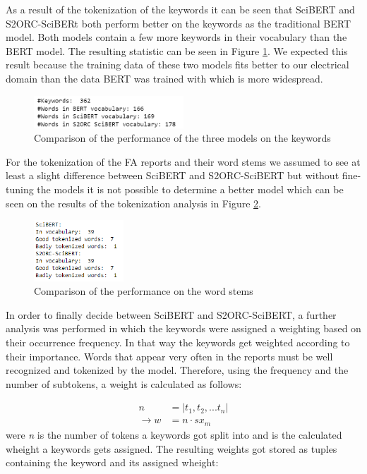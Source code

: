 As a result of the tokenization of the keywords it can be seen that SciBERT and S2ORC-SciBERt both perform better on the keywords as the traditional BERT model. Both models contain a few more keywords in their vocabulary than the BERT model. The resulting statistic can be seen in Figure \ref{fig:comparison}. We expected this result because the training data of these two models fits better to our electrical domain than the data BERT was trained with which is more widespread.


\begin{figure}[H]
	\centering
	\includegraphics[width=0.5\textwidth]{figures/keyword_comparison.PNG}
	\caption{Comparison of the performance of the three models on the keywords}
	\label{fig:comparison}
\end{figure}


For the tokenization of the FA reports and their word stems we assumed to see at least a slight difference between SciBERT and S2ORC-SciBERT but without fine-tuning the models it is not possible to determine a better model which can be seen on the results of the tokenization analysis in Figure \ref{fig:stemming_performance}.


\begin{figure}[H]
	\centering
	\includegraphics[width=0.3\textwidth]{figures/wordstems_comparison.PNG}
	\caption{Comparison of the performance on the word stems}
	\label{fig:stemming_performance}
\end{figure}

In order to finally decide between SciBERT and S2ORC-SciBERT, a further analysis was performed in which the keywords were assigned a weighting based on their occurrence frequency. In that way the keywords get weighted according to their importance. Words that appear very often in the reports must be well recognized and tokenized by the model. Therefore, using the frequency and the number of subtokens, a weight is calculated as follows:

\begin{align}
	n &= |t_1, t_2, ... t_n| \\
	\to w &= n \cdot sx_m
\end{align}
were \textit{n} is the number of tokens a keywords got split into and  is the calculated wheight a keywords gets assigned. \newline
The resulting weights got stored as tuples containing the keyword and its assigned wheight:

